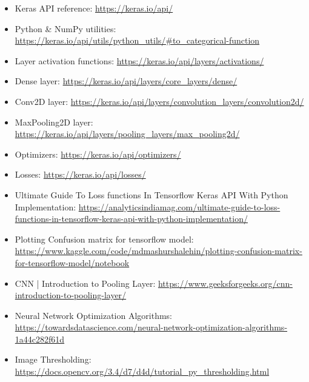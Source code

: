 \documentclass[a4paper, 12pt]{article}
\begin{document}
\begin{itemize}
    \item Keras API reference: \url{https://keras.io/api/}
    \item Python \& NumPy utilities: \url{https://keras.io/api/utils/python_utils/#to_categorical-function}
    \item Layer activation functions: \url{https://keras.io/api/layers/activations/}
    \item Dense layer: \url{https://keras.io/api/layers/core_layers/dense/}
    \item Conv2D layer: \url{https://keras.io/api/layers/convolution_layers/convolution2d/}
    \item MaxPooling2D layer: \url{https://keras.io/api/layers/pooling_layers/max_pooling2d/}
    \item Optimizers: \url{https://keras.io/api/optimizers/}
    \item Losses: \url{https://keras.io/api/losses/}
    \item Ultimate Guide To Loss functions In Tensorflow Keras API With Python Implementation: \url{https://analyticsindiamag.com/ultimate-guide-to-loss-functions-in-tensorflow-keras-api-with-python-implementation/}
    \item Plotting Confusion matrix for tensorflow model: \url{https://www.kaggle.com/code/mdmashurshalehin/plotting-confusion-matrix-for-tensorflow-model/notebook}
    \item CNN | Introduction to Pooling Layer: \url{https://www.geeksforgeeks.org/cnn-introduction-to-pooling-layer/}
    \item Neural Network Optimization Algorithms: \url{https://towardsdatascience.com/neural-network-optimization-algorithms-1a44c282f61d}
    \item Image Thresholding: \url{https://docs.opencv.org/3.4/d7/d4d/tutorial_py_thresholding.html}
\end{itemize}
\end{document}
